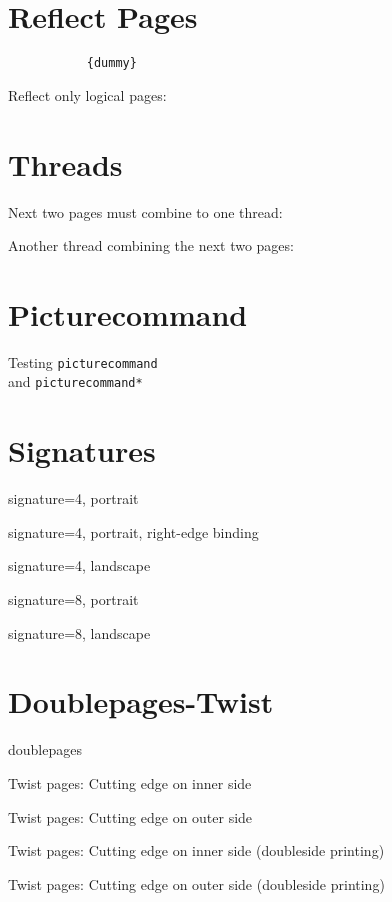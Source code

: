 \documentclass[a4paper]{article}
\begin{document}
\section{Reflect Pages}
\begingroup
\verb||
\verb|           {dummy}|

%
\verb||

%
Reflect only logical pages:\par
\verb||

\endgroup


\begingroup
\section{Threads}
Next two pages must combine to one thread:


Another thread combining the next two pages:


\endgroup

\section{Picturecommand}
\begingroup
Testing \texttt{picturecommand}\\ and \texttt{picturecommand*}

\endgroup

\section{Signatures}
\begingroup
signature=4, portrait

signature=4, portrait, right-edge binding

signature=4, landscape

signature=8, portrait

signature=8, landscape

\endgroup

\section{Doublepages-Twist}
\begingroup
doublepages

Twist pages: Cutting edge on inner side

Twist pages: Cutting edge on outer side

Twist pages: Cutting edge on inner side (doubleside printing)

Twist pages: Cutting edge on outer side (doubleside printing)

\endgroup
\end{document}
